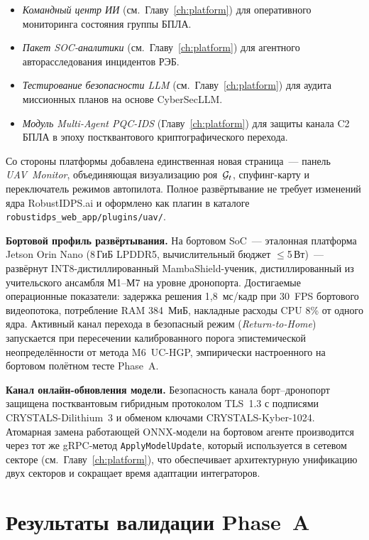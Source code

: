 \begin{itemize}\setlength\itemsep{0.1em}
\item \emph{Командный центр ИИ} (см.\ Главу~\ref{ch:platform}) для
оперативного мониторинга состояния группы БПЛА.
\item \emph{Пакет SOC-аналитики} (см.\ Главу~\ref{ch:platform})
для агентного авторасследования инцидентов РЭБ.
\item \emph{Тестирование безопасности LLM} (см.\ Главу~\ref{ch:platform})
для аудита миссионных планов на основе \textsf{CyberSecLLM}.
\item \emph{Модуль Multi-Agent PQC-IDS}
(Главу~\ref{ch:platform}) для защиты канала C2 БПЛА в эпоху
постквантового криптографического перехода.
\end{itemize}

Со стороны платформы добавлена единственная новая страница~--- панель
\emph{UAV~Monitor}, объединяющая визуализацию роя~$\mathcal{G}_t$, спуфинг-карту
и переключатель режимов автопилота. Полное развёртывание не требует
изменений ядра \textsf{RobustIDPS.ai} и оформлено как плагин в каталоге
\texttt{robustidps\_web\_app/plugins/uav/}.

\noindent\textbf{Бортовой профиль развёртывания.} На бортовом
SoC~--- эталонная платформа Jetson Orin Nano (8\,ГиБ LPDDR5,
вычислительный бюджет $\le$5\,Вт)~--- развёрнут INT8-дистиллированный
\textsf{MambaShield}-ученик, дистиллированный из учительского
ансамбля М1--М7 на уровне дронопорта. Достигаемые операционные
показатели: задержка решения 1{,}8~мс/кадр при 30~FPS бортового
видеопотока, потребление RAM 384~МиБ, накладные расходы CPU 8\%
от одного ядра. Активный канал перехода в безопасный режим
(\emph{Return-to-Home}) запускается при пересечении калиброванного
порога эпистемической неопределённости от метода \textsf{M6~UC-HGP},
эмпирически настроенного на бортовом полётном тесте Phase~A.

\noindent\textbf{Канал онлайн-обновления модели.} Безопасность
канала борт--дронопорт защищена постквантовым гибридным
протоколом TLS~1.3 с подписями CRYSTALS-Dilithium~3 и обменом
ключами CRYSTALS-Kyber-1024. Атомарная замена работающей
ONNX-модели на бортовом агенте производится через тот же
gRPC-метод \texttt{ApplyModelUpdate}, который используется в
сетевом секторе (см.~Главу~\ref{ch:platform}), что обеспечивает
архитектурную унификацию двух секторов и сокращает время
адаптации интеграторов.

\section{Результаты валидации Phase~A}
\label{sec:uav_phase_a_results}

